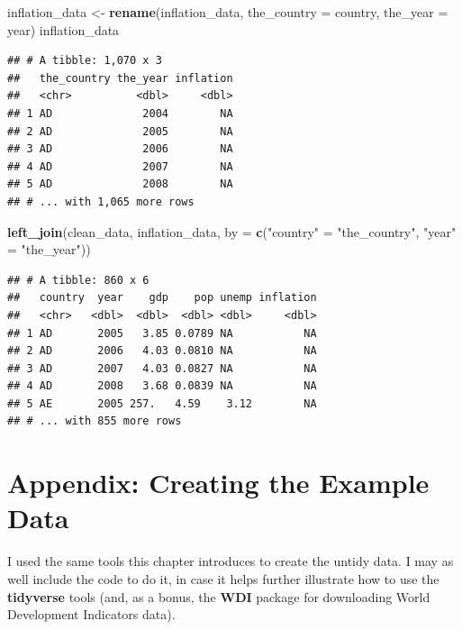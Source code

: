 \documentclass[
  12pt,
  oneside,openany]{book}
\newenvironment{Shaded}{\begin{snugshade}}{\end{snugshade}}
\newcommand{\DataTypeTok}[1]{\textcolor[rgb]{0.13,0.29,0.53}{#1}}
\newcommand{\KeywordTok}[1]{\textcolor[rgb]{0.13,0.29,0.53}{\textbf{#1}}}
\newcommand{\NormalTok}[1]{#1}
\newcommand{\StringTok}[1]{\textcolor[rgb]{0.31,0.60,0.02}{#1}}
\begin{document}
\begin{Shaded}
\begin{Highlighting}[]
\NormalTok{inflation\_data \textless{}{-}}\StringTok{ }\KeywordTok{rename}\NormalTok{(inflation\_data,}
                         \DataTypeTok{the\_country =}\NormalTok{ country,}
                         \DataTypeTok{the\_year =}\NormalTok{ year)}
\NormalTok{inflation\_data}
\end{Highlighting}
\end{Shaded}

\begin{verbatim}
## # A tibble: 1,070 x 3
##   the_country the_year inflation
##   <chr>          <dbl>     <dbl>
## 1 AD              2004        NA
## 2 AD              2005        NA
## 3 AD              2006        NA
## 4 AD              2007        NA
## 5 AD              2008        NA
## # ... with 1,065 more rows
\end{verbatim}

\begin{Shaded}
\begin{Highlighting}[]
\KeywordTok{left\_join}\NormalTok{(clean\_data,}
\NormalTok{          inflation\_data,}
          \DataTypeTok{by =} \KeywordTok{c}\NormalTok{(}\StringTok{"country"}\NormalTok{ =}\StringTok{ "the\_country"}\NormalTok{, }\StringTok{"year"}\NormalTok{ =}\StringTok{ "the\_year"}\NormalTok{))}
\end{Highlighting}
\end{Shaded}

\begin{verbatim}
## # A tibble: 860 x 6
##   country  year    gdp    pop unemp inflation
##   <chr>   <dbl>  <dbl>  <dbl> <dbl>     <dbl>
## 1 AD       2005   3.85 0.0789 NA           NA
## 2 AD       2006   4.03 0.0810 NA           NA
## 3 AD       2007   4.03 0.0827 NA           NA
## 4 AD       2008   3.68 0.0839 NA           NA
## 5 AE       2005 257.   4.59    3.12        NA
## # ... with 855 more rows
\end{verbatim}

\hypertarget{appendix-creating-the-example-data}{%
\section{Appendix: Creating the Example Data}\label{appendix-creating-the-example-data}}

I used the same tools this chapter introduces to create the untidy data. I may as well include the code to do it, in case it helps further illustrate how to use the \textbf{tidyverse} tools (and, as a bonus, the \textbf{WDI} package for downloading World Development Indicators data).
\end{document}
